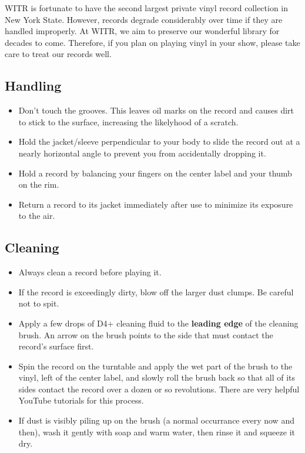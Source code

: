 \documentclass{witrman}
\begin{document}
WITR is fortunate to have the second largest private vinyl record collection in
New York State.  However, records degrade considerably over time if they are
handled improperly.  At WITR, we aim to preserve our wonderful library for
decades to come.  Therefore, if you plan on playing vinyl in your show, please
take care to treat our records well.

\subsection{Handling}

\begin{itemize}
    \item Don't touch the grooves.  This leaves oil marks on the record and
        causes dirt to stick to the surface, increasing the likelyhood of a
        scratch.
    \item Hold the jacket/sleeve perpendicular to your body to slide the record
        out at a nearly horizontal angle to prevent you from accidentally
        dropping it.
    \item Hold a record by balancing your fingers on the center label and your
        thumb on the rim.
    \item Return a record to its jacket immediately after use to minimize its
        exposure to the air.
\end{itemize}


\subsection{Cleaning}

\begin{itemize}
    \item Always clean a record before playing it.
    \item If the record is exceedingly dirty, blow off the larger dust clumps.
        Be careful not to spit.
    \item Apply a few drops of D4+ cleaning fluid to the \textbf{leading edge}
        of the cleaning brush.  An arrow on the brush points to the side that
        must contact the record's surface first.
    \item Spin the record on the turntable and apply the wet part of the brush
        to the vinyl, left of the center label, and slowly roll the brush back
        so that all of its sides contact the record over a dozen or so
        revolutions.  There are very helpful YouTube tutorials for this process.
    \item If dust is visibly piling up on the brush (a normal occurrance every
        now and then), wash it gently with soap and warm water, then rinse it
        and squeeze it dry.
\end{itemize}
\end{document}

